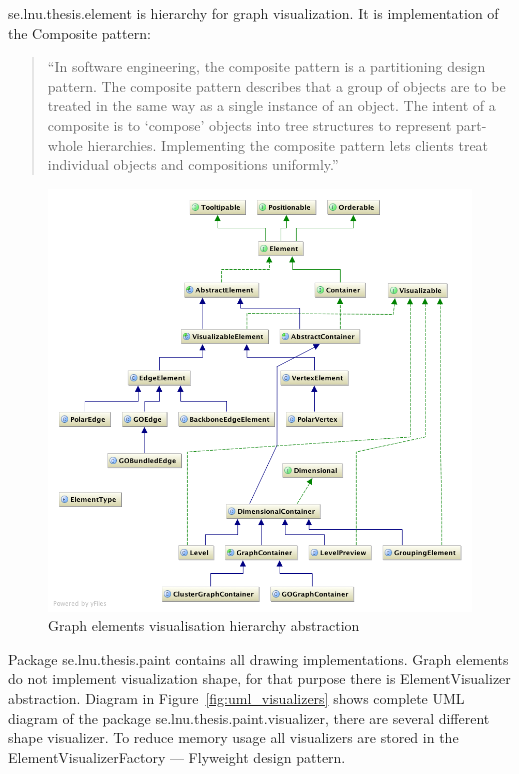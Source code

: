 \textsf{se.lnu.thesis.element} is hierarchy for graph visualization. It is implementation of the Composite pattern:

\begin{quotation}
``In software engineering, the composite pattern is a partitioning design pattern.
The composite pattern describes that a group of objects are to be treated in the same way as a single instance of an object.
The intent of a composite is to `compose' objects into tree structures to represent part-whole hierarchies.
Implementing the composite pattern lets clients treat individual objects and compositions uniformly.''~\cite{COMPOSITE_GAMMA}
\end{quotation}

\begin{figure}[h!]
\centering
\includegraphics[scale=0.4]{pictures/uml_elements.png}
\caption{Graph elements visualisation hierarchy abstraction}
\label{fig:uml_elements}
\end{figure}

Package \textsf{se.lnu.thesis.paint} contains all drawing implementations.
Graph elements do not implement visualization shape, for that purpose there is \textsf{ElementVisualizer} abstraction. Diagram in Figure~\ref{fig:uml_visualizers} shows complete UML diagram of the package \textsf{se.lnu.thesis.paint.visualizer}, there are several different shape visualizer. To reduce memory usage all visualizers are stored in the \textsf{ElementVisualizerFactory} --- Flyweight design pattern.

